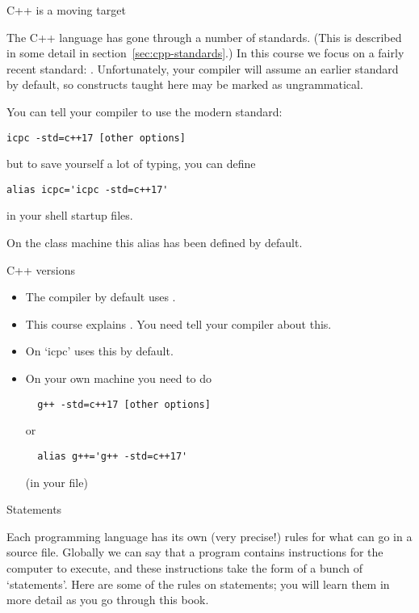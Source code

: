  {C++ is a moving target}

The C++ language has gone through a number of standards. (This is
described in some detail in section~\ref{sec:cpp-standards}.) In this
course we focus on a fairly recent standard: 
.
Unfortunately, your compiler will assume an earlier standard by default,
so constructs taught here may be marked as ungrammatical.

You can tell your compiler to use the modern standard:
\begin{verbatim}
icpc -std=c++17 [other options]
\end{verbatim}
but to save yourself a lot of typing, you can define
\begin{verbatim}
alias icpc='icpc -std=c++17'
\end{verbatim}
in your shell startup files.
\begin{tacc}
On the class  machine this alias has been defined by default.
\end{tacc}

\begin{slide}{C++ versions}
  \label{sl:cpp-version}
  \begin{itemize}
  \item
    The compiler by default uses . 
  \item This course explains . You need tell your compiler
    about this.
  \item On  `icpc' uses this by default.
  \item On your own machine you need to do
\begin{verbatim}
  g++ -std=c++17 [other options]
\end{verbatim}
or
\begin{verbatim}
  alias g++='g++ -std=c++17'
\end{verbatim}
(in your  file)
  \end{itemize}
\end{slide}

 {Statements}
\label{sec:statements}

Each programming language has its own (very precise!) rules for what
can go in a source file. Globally we can say that a program contains
instructions for the computer to execute, and these instructions take
the form of a bunch of `statements'. Here are some of the rules on
statements; you will learn them in more detail as you go through this
book.

